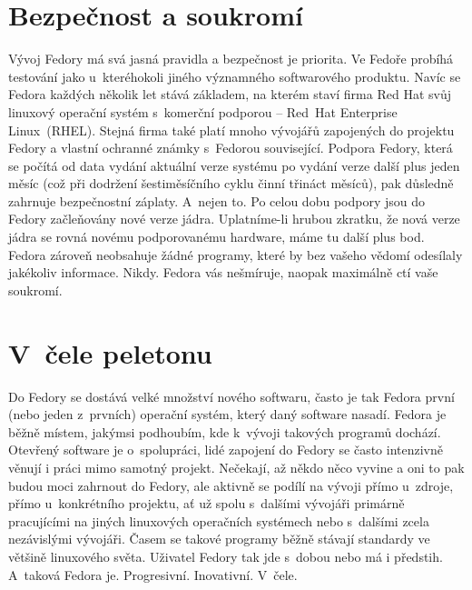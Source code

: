 \section*{Bezpečnost a soukromí}
Vývoj Fedory má svá jasná pravidla a bezpečnost je priorita. Ve Fedoře probíhá testování jako u~kteréhokoli jiného významného softwarového produktu. Navíc se Fedora každých několik let stává základem, na kterém staví firma Red Hat svůj linuxový operační systém s~komerční podporou -- Red~Hat Enter\-prise Linux~(RHEL). Stejná firma také platí mnoho vývojářů zapojených do projektu Fedory a vlastní ochranné známky s~Fedorou související. Podpora Fedory, která se počítá od data vydání aktuální verze systému po vydání verze další plus jeden měsíc (což při dodržení šestiměsíčního cyklu činní třináct měsíců), pak důsledně zahrnuje bezpečnostní záplaty. A~nejen to. Po celou dobu podpory jsou do Fedory začleňovány nové verze jádra. Uplatníme-li hrubou zkratku, že nová verze jádra se rovná novému podporovanému hardware, máme tu další plus bod. Fedora zároveň neobsahuje žádné programy, které by bez vašeho vědomí odesílaly jakékoliv informace. Nikdy. Fedora vás nešmíruje, naopak maximálně ctí vaše soukromí.

\section*{V~čele peletonu}
Do Fedory se dostává velké množství nového softwaru, často je tak Fedora první (nebo jeden z~prvních) operační systém, který daný software nasadí. Fedora je běžně místem, jakýmsi podhoubím, kde k~vývoji takových programů dochází. Otevřený software je o~spolupráci, lidé zapojení do Fedory se často intenzivně věnují i práci mimo samotný projekt. Nečekají, až někdo něco vyvine a oni to pak budou moci zahrnout do Fedory, ale aktivně se podílí na vývoji přímo u~zdroje, přímo u~konkrétního projektu, ať už spolu s~dalšími vývojáři primárně pracujícími na jiných linuxových operačních systémech nebo s~dalšími zcela nezávislými vývojáři. Časem se takové programy běžně stávají standardy ve většině linuxového světa. Uživatel Fedory tak jde s~dobou nebo má i předstih. A~taková Fedora je. Progresivní. Inovativní. V~čele.


